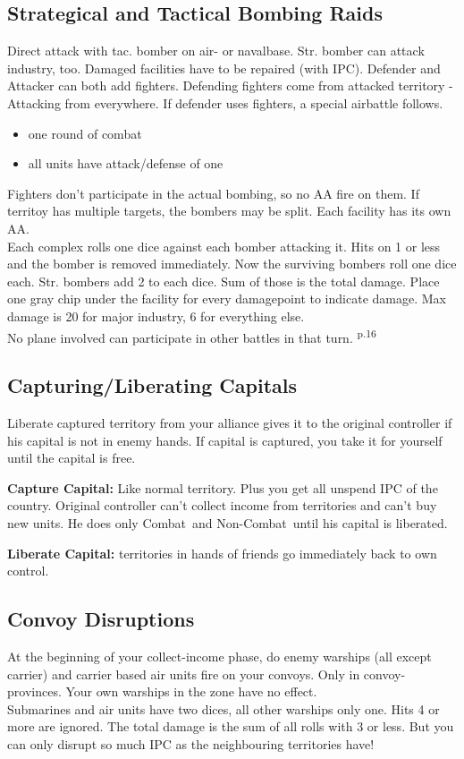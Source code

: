 \documentclass[10pt,a4paper,landscape]{article}
\begin{document}
\begin{multicols*}{3}
\subsection*{Strategical and Tactical Bombing Raids}
Direct attack with tac. bomber on air- or navalbase. Str. bomber can attack industry, too.
Damaged facilities have to be repaired (with IPC). Defender and Attacker can both add fighters. Defending fighters come from attacked territory - Attacking from everywhere. If defender uses fighters, a special airbattle follows. 
\begin{itemize}
\item one round of combat
\item all units have attack/defense of one
\end{itemize}
Fighters don't participate in the actual bombing, so no AA fire on them. If territoy has multiple targets, the bombers may be split. Each facility has its own AA.\\
Each complex rolls one dice against each bomber attacking it. Hits on 1 or less and the bomber is removed immediately. Now the surviving bombers roll one dice each. Str. bombers add 2 to each dice. Sum of those is the total damage. Place one gray chip under the facility for every damagepoint to indicate damage. Max damage is 20 for major industry, 6 for everything else.\\
No plane involved can participate in other battles in that turn. \textsuperscript{p.16}

\subsection*{Capturing/Liberating Capitals}
Liberate captured territory from your alliance gives it to the original controller if his capital is not in enemy hands. If capital is captured, you take it for yourself until the capital is free.

\textbf{Capture Capital:} Like normal territory. Plus you get all unspend IPC of the country. Original controller can't collect income from territories and can't buy new units. He does only \glqq Combat\grqq\ and \glqq Non-Combat\grqq\ until his capital is liberated.

\textbf{Liberate Capital:} territories in hands of friends go immediately back to own control.

\begin{minipage}{\linewidth}
\subsection*{Convoy Disruptions}
At the beginning of your collect-income phase, do enemy warships (all except carrier) and carrier based air units fire on your convoys. Only in convoy-provinces. Your own warships in the zone have no effect.\\
Submarines and air units have two dices, all other warships only one. Hits 4 or more are ignored. The total damage is the sum of all rolls with 3 or less. But you can only disrupt so much IPC as the neighbouring territories have!
\end{minipage}



\end{multicols*}
\end{document}
